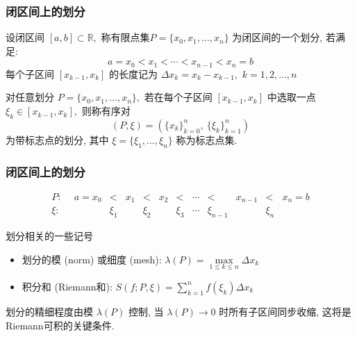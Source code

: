 
\begin{frame}
\frametitle{闭区间上的划分}

\begin{Def}[划分, partition]
设闭区间 $[a,b] \subset \mathbb{R},$ 称有限点集$P = \{x_0,x_1,\dots,x_n\}$ 为闭区间的一个\alert{划分}, 若满足:
\begin{equation*}
a = x_0 < x_1 < \cdots < x_{n-1} < x_n = b
\end{equation*}
每个子区间 $[x_{k-1},x_k]$ 的长度记为 $\Delta x_k = x_k - x_{k-1},$ $k=1,2,\dots,n$
\end{Def}

\begin{Def}
对任意划分 $P = \{x_0,x_1,\dots,x_n\},$ 若在每个子区间 $[x_{k-1},x_k]$ 中选取一点 $\xi_k \in [x_{k-1},x_k],$ 则称有序对
\[
(P,\xi) = (\{x_k\}_{k=0}^n,\ \{\xi_k\}_{k=1}^n)
\]
为\alert{带标志点的划分}, 其中 $\xi = \{\xi_1,\dots,\xi_n\}$ 称为标志点集.
\end{Def}

\end{frame}


\begin{frame}
\frametitle{闭区间上的划分}

\[
\begin{array}{cccccccccccc}
P: ~~ & a=x_0 & < & x_1 & < & x_2 & < & \cdots & < & x_{n-1} & < & x_n = b \\
\xi: ~~ & & \xi_1 & & \xi_2 & & \xi_3 & \cdots & \xi_{n-1} & & \xi_n
\end{array}
\]

\pause

\begin{block}{划分相关的一些记号}
\begin{itemize}
\item 划分的\alert{模} (norm) 或\alert{细度} (mesh): $\lambda(P) = \max\limits_{1 \leq k \leq n} \Delta x_k$
\item 积分和 (Riemann和): $S(f; P,\xi) = \sum_{k=1}^n f(\xi_k)\Delta x_k$
\end{itemize}
\end{block}

\pause

\begin{attnblock}
划分的精细程度由模 $\lambda(P)$ 控制, 当 $\lambda(P) \to 0$ 时所有子区间同步收缩, 这将是Riemann可积的关键条件.
\end{attnblock}

\end{frame}

